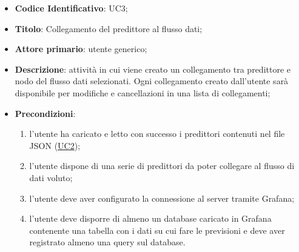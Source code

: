
		\begin{itemize}
			\item\textbf{Codice Identificativo}: UC3;
			\item\textbf{Titolo}: Collegamento del predittore al flusso dati;
			\item\textbf{Attore primario}: utente generico;
			\item\textbf{Descrizione}: attività in cui viene creato un collegamento tra predittore e nodo del flusso dati selezionati. Ogni collegamento creato dall'utente sarà disponibile per modifiche e cancellazioni in una lista di collegamenti;
			\item\textbf{Precondizioni}:
				\begin{enumerate}
					\item l'utente ha caricato e letto con successo i predittori contenuti nel file JSON (\hyperref[par:UC2]{UC2});
					\item l'utente dispone di una serie di predittori da poter collegare al flusso di dati voluto;
					\item l’utente deve aver configurato la connessione al server tramite Grafana;
					\item l’utente deve disporre di almeno un database caricato in Grafana contenente una tabella con i dati su cui fare le previsioni e deve aver registrato almeno una query sul database.
					


\end{enumerate}
\end{itemize}
